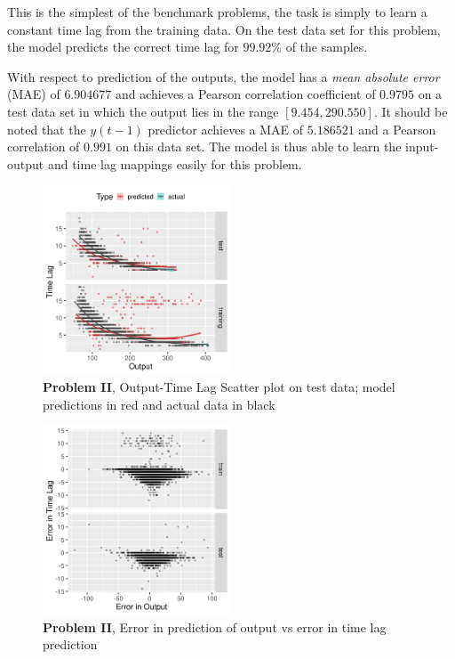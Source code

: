 \documentclass[envcountsect,runningheads]{llncs}
\theoremstyle{etoile}
\begin{document}
This is the simplest of the benchmark problems, the task is simply to learn a constant time lag from 
the training data. On the test data set for this problem, the model predicts the correct time lag for 
$99.92\%$ of the samples. 

With respect to prediction of the outputs, the model has a \emph{mean absolute error} (MAE) of 
$6.904677$ and achieves a Pearson correlation coefficient of $0.9795$ on a test data set in which the 
output lies in the range $[9.454, 290.550]$. It should be noted that the $y(t - 1)$ predictor 
achieves a MAE of $5.186521$ and a Pearson correlation of $0.991$ on this data set. The model is 
thus able to learn the input-output and time lag mappings easily for this problem.

\begin{figure}[h]
\vspace{.3in}
\centerline{\includegraphics[width=0.5\textwidth]{figures/exp2_scatter_v_tl.png}}
\vspace{.3in}
\caption{\textbf{Problem II}, Output-Time Lag Scatter plot on test data; model predictions in red and actual data in black}
\label{fig:problem2_scatter}
\end{figure}

\begin{figure}[h]
\vspace{.3in}
\centerline{\includegraphics[width=0.5\textwidth]{figures/exp2_scatter_errors.png}}
\vspace{.3in}
\caption{\textbf{Problem II}, Error in prediction of output vs error in time lag prediction}
\label{fig:problem2_error}
\end{figure}
\end{document}
